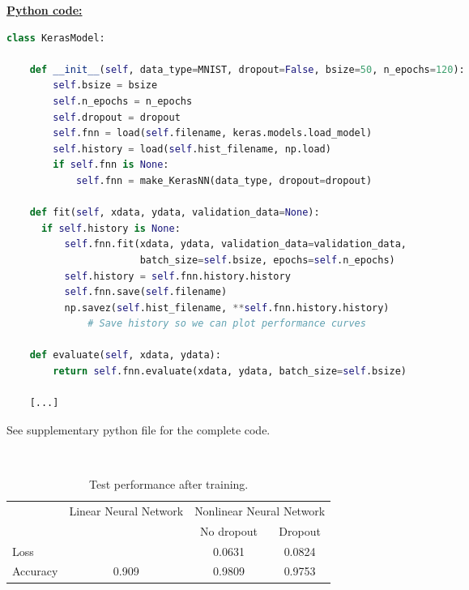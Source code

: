 \documentclass{article}
\begin{document}
\vspace{0.5cm}
\noindent \underline{\textbf{Python code:}} \\
\begin{biomathy}
\begin{lstlisting}[language=python]
class KerasModel:

    def __init__(self, data_type=MNIST, dropout=False, bsize=50, n_epochs=120):
        self.bsize = bsize
        self.n_epochs = n_epochs
        self.dropout = dropout
        self.fnn = load(self.filename, keras.models.load_model)
        self.history = load(self.hist_filename, np.load)
        if self.fnn is None:
            self.fnn = make_KerasNN(data_type, dropout=dropout)

    def fit(self, xdata, ydata, validation_data=None):
      if self.history is None:
          self.fnn.fit(xdata, ydata, validation_data=validation_data,
                       batch_size=self.bsize, epochs=self.n_epochs)
          self.history = self.fnn.history.history
          self.fnn.save(self.filename)
          np.savez(self.hist_filename, **self.fnn.history.history)
              # Save history so we can plot performance curves

    def evaluate(self, xdata, ydata):
        return self.fnn.evaluate(xdata, ydata, batch_size=self.bsize)

    [...]
\end{lstlisting}
\end{biomathy}

See supplementary python file for the complete code.

\noindent \\
\begin{table}[H]
  \centering
  \caption[width=7in]{
    Test performance after training.
    \label{ztable2}
    }
  \begin{tabular}{lccc}
     \toprule
          & Linear Neural Network & \multicolumn{2}{c}{Nonlinear Neural Network} \\
    \cline{3-4}
    {} & {} &       No dropout & Dropout \\
    \midrule
    Loss     &   &         0.0631 &    0.0824 \\
    Accuracy & 0.909  &          0.9809 &   0.9753 \\
    \bottomrule
  \end{tabular}
\end{table}
\end{document}
